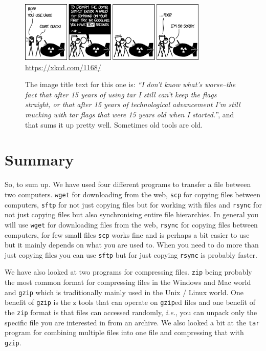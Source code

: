 \documentclass[watermark]{pbpreprint}
\begin{document}
\begin{figure}[bht]
    \centering
    \includegraphics[width=0.8\textwidth]{Figures/xkcd_tar.png}\\
    \url{https://xkcd.com/1168/}
    \caption{The image title text for this one is: \textit{``I don't know
    what's worse--the fact that after 15 years of using tar I still can't keep
    the flags straight, or that after 15 years of technological advancement I'm
    still mucking with tar flags that were 15 years old when I started.''}, and
    that sums it up pretty well. Sometimes old tools are old.\label{xkcdtar}}
\end{figure}

\section{Summary}
So, to sum up. We have used four different programs to transfer a file between
two computers. \texttt{wget} for downloading from the web,  \texttt{scp} for
copying files between computers, \texttt{sftp} for not just copying files but
for working with files and \texttt{rsync} for not just copying files but also
synchronising entire file hierarchies. In general you will use \texttt{wget}
for downloading files from the web, \texttt{rsync} for copying files between
computers, for few small files \texttt{scp} works fine and is perhaps a bit
easier to use but it mainly depends on what you are used to. When you need to
do more than just copying files you can use \texttt{sftp} but for just copying
\texttt{rsync} is probably faster.

We have also looked at two programs for compressing files. \texttt{zip} being
probably the most common format for compressing files in the Windows and Mac
world and \texttt{gzip} which is traditionally mainly used in the Unix / Linux
world. One benefit of \texttt{gzip} is the z tools that can operate on
\texttt{gzip}ed files and one benefit of the \texttt{zip} format is that files
can accessed randomly, \textit{i.e.}, you can unpack only the specific file you
are interested in from an archive. We also looked a bit at the \texttt{tar}
program for combining multiple files into one file and compressing that with
\texttt{gzip}.
\end{document}
